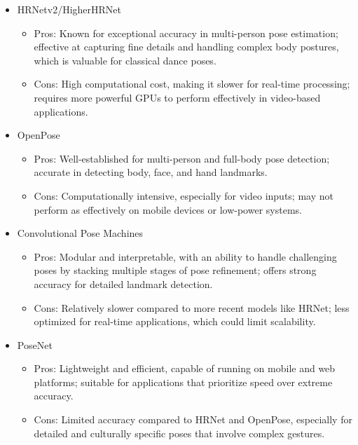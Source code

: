 \begin{itemize}
    \item HRNetv2/HigherHRNet
    \begin{itemize}
        \item Pros: Known for exceptional accuracy in multi-person pose estimation; effective at capturing fine details and handling complex body postures, which is valuable for classical dance poses.
    \item Cons: High computational cost, making it slower for real-time processing; requires more powerful GPUs to perform effectively in video-based applications.
    \end{itemize}
    \item OpenPose
    \begin{itemize}
        \item Pros: Well-established for multi-person and full-body pose detection; accurate in detecting body, face, and hand landmarks.
    \item Cons: Computationally intensive, especially for video inputs; may not perform as effectively on mobile devices or low-power systems.
    \end{itemize}
    
    \item Convolutional Pose Machines
    \begin{itemize}
            \item Pros: Modular and interpretable, with an ability to handle challenging poses by stacking multiple stages of pose refinement; offers strong accuracy for detailed landmark detection.
    \item Cons: Relatively slower compared to more recent models like HRNet; less optimized for real-time applications, which could limit scalability.
    \end{itemize}    

    \item PoseNet
    \begin{itemize}
            \item Pros: Lightweight and efficient, capable of running on mobile and web platforms; suitable for applications that prioritize speed over extreme accuracy.
    \item Cons: Limited accuracy compared to HRNet and OpenPose, especially for detailed and culturally specific poses that involve complex gestures.
    \end{itemize}
\end{itemize}


